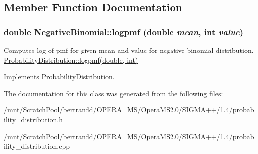 \subsection{Member Function Documentation}
\hypertarget{classNegativeBinomial_a5ad5901d26f1797cbe52e9569b312c5d}{
\subsubsection[{logpmf}]{\setlength{\rightskip}{0pt plus 5cm}double NegativeBinomial::logpmf (double {\em mean}, \/  int {\em value})}}
\label{classNegativeBinomial_a5ad5901d26f1797cbe52e9569b312c5d}


Computes log of pmf for given mean and value for negative binomial distribution.  \hyperlink{classProbabilityDistribution_a63fcfece2a48875e736e6d8d3214c6e3}{ProbabilityDistribution::logpmf(double, int)} 

Implements \hyperlink{classProbabilityDistribution_a63fcfece2a48875e736e6d8d3214c6e3}{ProbabilityDistribution}.

The documentation for this class was generated from the following files:\begin{DoxyCompactItemize}
\item 
/mnt/ScratchPool/bertrandd/OPERA\_\-MS/OperaMS2.0/SIGMA++/1.4/probability\_\-distribution.h\item 
/mnt/ScratchPool/bertrandd/OPERA\_\-MS/OperaMS2.0/SIGMA++/1.4/probability\_\-distribution.cpp\end{DoxyCompactItemize}
